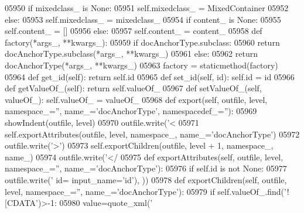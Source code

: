 \begin{DoxyCode}
{{{{{{{{{{{{{{{{{{{{{{{{{{{{{{{{{{{{{{{{{{{{{{{{{{{{{{{{{{{{{{{{{{{{{{{{{{{{{{{{{{{{{{{{{{{{{{{{{{{{{{{{{{{{{{{{{{{{{{{{{{{{{{{{{{{{{{{{{{{{{{{{{{{{{{{{{{{{{{{{{{{{{{{{{{{{{{{{{{{{{{{{{{{{{{{{{{{{{{{{{{{{{{{{{{{{{{{{{{{{{{{{{{{{{{{{{{{{{{{{{{{{{{{{{{{{{{{{{{{{{{{{{{{{{{{{{{{{{{{{{{{{{{{{{{{{{{{{{{{{{{{{{{{{{{{{{{{{{{{{{{{{{{{{{{{{{{{{{{{{{{{{{{{{{{{{{{{{{{{{{{{{{{{{05950         \textcolor{keywordflow}{if} mixedclass\_ \textcolor{keywordflow}{is} \textcolor{keywordtype}{None}:
05951             self.mixedclass_ = MixedContainer
05952         \textcolor{keywordflow}{else}:
05953             self.mixedclass_ = mixedclass\_
05954         \textcolor{keywordflow}{if} content\_ \textcolor{keywordflow}{is} \textcolor{keywordtype}{None}:
05955             self.content_ = []
05956         \textcolor{keywordflow}{else}:
05957             self.content_ = content\_
05958     \textcolor{keyword}{def }factory(*args\_, **kwargs\_):
05959         \textcolor{keywordflow}{if} docAnchorType.subclass:
05960             \textcolor{keywordflow}{return} docAnchorType.subclass(*args\_, **kwargs\_)
05961         \textcolor{keywordflow}{else}:
05962             \textcolor{keywordflow}{return} docAnchorType(*args\_, **kwargs\_)
05963     factory = staticmethod(factory)
05964     \textcolor{keyword}{def }get_id(self): \textcolor{keywordflow}{return} self.id
05965     \textcolor{keyword}{def }set_id(self, id): self.id = id
05966     \textcolor{keyword}{def }getValueOf_(self): \textcolor{keywordflow}{return} self.valueOf\_
05967     \textcolor{keyword}{def }setValueOf_(self, valueOf\_): self.valueOf\_ = valueOf\_
05968     \textcolor{keyword}{def }export(self, outfile, level, namespace\_='', name\_='docAnchorType', namespacedef\_=''):
05969         showIndent(outfile, level)
05970         outfile.write(\textcolor{stringliteral}{'<%
05971         self.exportAttributes(outfile, level, namespace\_, name\_=\textcolor{stringliteral}{'docAnchorType'})
05972         outfile.write(\textcolor{stringliteral}{'>'})
05973         self.exportChildren(outfile, level + 1, namespace\_, name\_)
05974         outfile.write(\textcolor{stringliteral}{'</%
05975     \textcolor{keyword}{def }exportAttributes(self, outfile, level, namespace\_='', name\_='docAnchorType'):
05976         \textcolor{keywordflow}{if} self.id \textcolor{keywordflow}{is} \textcolor{keywordflow}{not} \textcolor{keywordtype}{None}:
05977             outfile.write(\textcolor{stringliteral}{' id=%
      input\_name=\textcolor{stringliteral}{'id'}), ))
05978     \textcolor{keyword}{def }exportChildren(self, outfile, level, namespace\_='', name\_='docAnchorType'):
05979         \textcolor{keywordflow}{if} self.valueOf\_.find(\textcolor{stringliteral}{'![CDATA'})>-1:
05980             value=quote_xml(\textcolor{stringliteral}{'%
}}}}}}}}}}}}}}}}}}}}}}}}}}}}}}}}}}}}}}}}}}}}}}}}}}}}}}}}}}}}}}}}}}}}}}}}}}}}}}}}}}}}}}}}}}}}}}}}}}}}}}}}}}}}}}}}}}}}}}}}}}}}}}}}}}}}}}}}}}}}}}}}}}}}}}}}}}}}}}}}}}}}}}}}}}}}}}}}}}}}}}}}}}}}}}}}}}}}}}}}}}}}}}}}}}}}}}}}}}}}}}}}}}}}}}}}}}}}}}}}}}}}}}}}}}}}}}}}}}}}}}}}}}}}}}}}}}}}}}}}}}}}}}}}}}}}}}}}}}}}}}}}}}}}}}}}}}}}}}}}}}}}}}}}}}}}}}}}}}}}}}}}}}}}}}}}}}}}}}}}}}}}}}}}}}}}
\end{DoxyCode}

